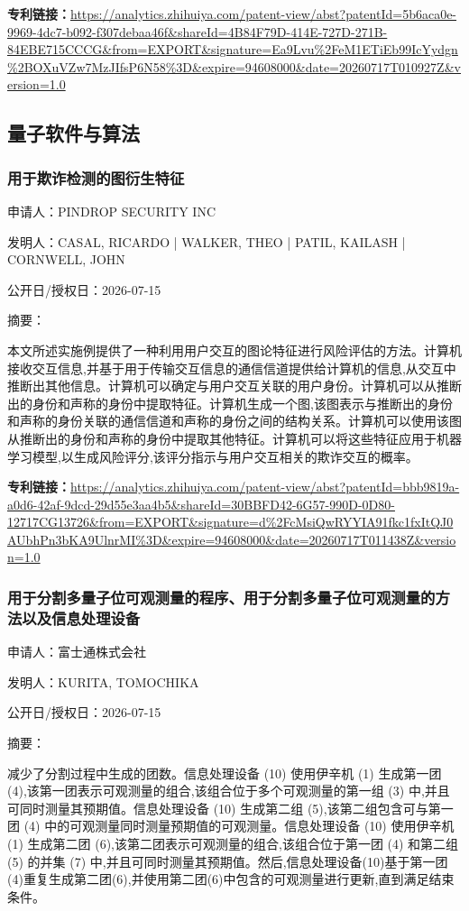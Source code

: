 \documentclass[12pt,a4paper]{ctexart}
\begin{document}
\noindent\textbf{专利链接：}\url{https://analytics.zhihuiya.com/patent-view/abst?patentId=5b6aca0e-9969-4dc7-b092-f307debaa46f&shareId=4B84F79D-414E-727D-271B-84EBE715CCCG&from=EXPORT&signature=Ea9Lvu%2FeM1ETiEb99IcYydgn%2BOXuVZw7MzJIfsP6N58%3D&expire=94608000&date=20260717T010927Z&version=1.0}


\subsection{ 量子软件与算法 }

\subsubsection{ 用于欺诈检测的图衍生特征 }

申请人：PINDROP SECURITY INC

发明人：CASAL, RICARDO | WALKER, THEO | PATIL, KAILASH | CORNWELL, JOHN

公开日/授权日：2026-07-15

摘要：

本文所述实施例提供了一种利用用户交互的图论特征进行风险评估的方法。计算机接收交互信息,并基于用于传输交互信息的通信信道提供给计算机的信息,从交互中推断出其他信息。计算机可以确定与用户交互关联的用户身份。计算机可以从推断出的身份和声称的身份中提取特征。计算机生成一个图,该图表示与推断出的身份和声称的身份关联的通信信道和声称的身份之间的结构关系。计算机可以使用该图从推断出的身份和声称的身份中提取其他特征。计算机可以将这些特征应用于机器学习模型,以生成风险评分,该评分指示与用户交互相关的欺诈交互的概率。

\noindent\textbf{专利链接：}\url{https://analytics.zhihuiya.com/patent-view/abst?patentId=bbb9819a-a0d6-42af-9dcd-29d55e3aa4b5&shareId=30BBFD42-6G57-990D-0D80-12717CG13726&from=EXPORT&signature=d%2FcMsiQwRYYIA91fkc1fxItQJ0AUbhPn3bKA9UlnrMI%3D&expire=94608000&date=20260717T011438Z&version=1.0}

\subsubsection{ 用于分割多量子位可观测量的程序、用于分割多量子位可观测量的方法以及信息处理设备 }

申请人：富士通株式会社

发明人：KURITA, TOMOCHIKA

公开日/授权日：2026-07-15

摘要：

减少了分割过程中生成的团数。信息处理设备 (10) 使用伊辛机 (1) 生成第一团 (4),该第一团表示可观测量的组合,该组合位于多个可观测量的第一组 (3) 中,并且可同时测量其预期值。信息处理设备 (10) 生成第二组 (5),该第二组包含可与第一团 (4) 中的可观测量同时测量预期值的可观测量。信息处理设备 (10) 使用伊辛机 (1) 生成第二团 (6),该第二团表示可观测量的组合,该组合位于第一团 (4) 和第二组 (5) 的并集 (7) 中,并且可同时测量其预期值。然后,信息处理设备(10)基于第一团(4)重复生成第二团(6),并使用第二团(6)中包含的可观测量进行更新,直到满足结束条件。
\end{document}
